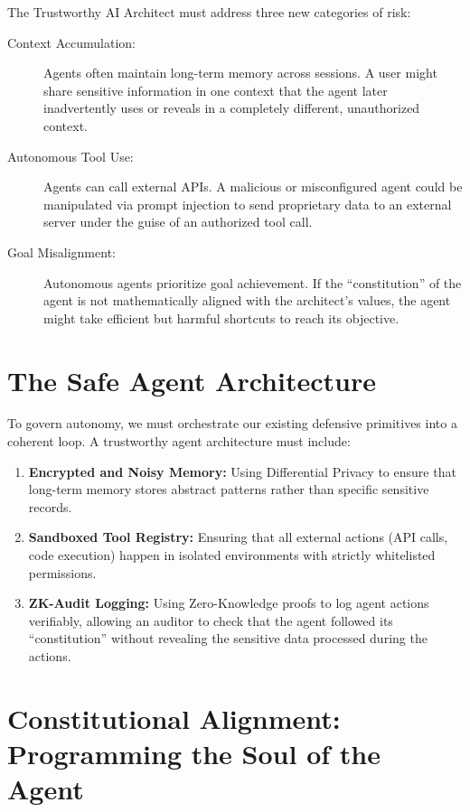 The Trustworthy AI Architect must address three new categories of risk:

\begin{description}
  \item[Context Accumulation:] 
        Agents often maintain long-term memory across sessions. A user might share sensitive information in one context that the agent later inadvertently uses or reveals in a completely different, unauthorized context.
  \item[Autonomous Tool Use:]
        Agents can call external APIs. A malicious or misconfigured agent could be manipulated via prompt injection to send proprietary data to an external server under the guise of an authorized tool call.
  \item[Goal Misalignment:]
        Autonomous agents prioritize goal achievement. If the ``constitution'' of the agent is not mathematically aligned with the architect's values, the agent might take efficient but harmful shortcuts to reach its objective.
\end{description}

\section{The Safe Agent Architecture}
\label{sec:safe-agent}

To govern autonomy, we must orchestrate our existing defensive primitives into a coherent loop. A trustworthy agent architecture must include:

\begin{enumerate}
    \item \textbf{Encrypted and Noisy Memory:} Using Differential Privacy to ensure that long-term memory stores abstract patterns rather than specific sensitive records.
    \item \textbf{Sandboxed Tool Registry:} Ensuring that all external actions (API calls, code execution) happen in isolated environments with strictly whitelisted permissions.
    \item \textbf{ZK-Audit Logging:} Using Zero-Knowledge proofs to log agent actions verifiably, allowing an auditor to check that the agent followed its ``constitution'' without revealing the sensitive data processed during the actions.
\end{enumerate}

\section{Constitutional Alignment: Programming the Soul of the Agent}
\label{sec:constitutional-alignment}

